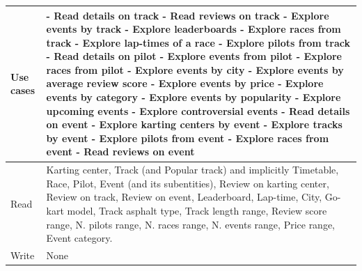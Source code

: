 \documentclass{beamer}
\begin{document}
\begin{frame}
    \begin{table}
        \tiny
        \begin{tabular}{|p{2cm}|p{6cm}|}
        \hline
        Use cases &
        - Read details on track \newline
        - Read reviews on track \newline
        - Explore events by track \newline
        - Explore leaderboards \newline
        - Explore races from track \newline
        - Explore lap-times of a race \newline
        - Explore pilots from track \newline
        - Read details on pilot \newline
        - Explore events from pilot \newline
        - Explore races from pilot \newline
        - Explore events by city \newline
        - Explore events by average review score \newline
        - Explore events by price \newline
        - Explore events by category \newline
        - Explore events by popularity \newline
        - Explore upcoming events \newline
        - Explore controversial events \newline
        - Read details on event \newline
        - Explore karting centers by event \newline
        - Explore tracks by event \newline
        - Explore pilots from event \newline
        - Explore races from event \newline
        - Read reviews on event \\
        \hline
        Read & Karting center, Track (and Popular track) and implicitly Timetable, Race, Pilot, Event (and its subentities),
        Review on karting center, Review on track, Review on event, Leaderboard, Lap-time, \newline
        City, Go-kart model, Track asphalt type, Track length range, Review score range, N. pilots range,
        N. races range, N. events range, Price range, Event category. \\
        \hline
        Write & None \\
        \hline
        \end{tabular}
    \end{table}
\end{frame}
\end{document}
